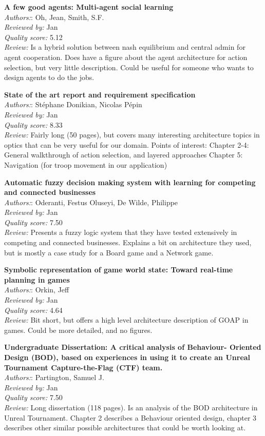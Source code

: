 \textbf{A few good agents: Multi-agent social learning}\\
\textit{Authors:}: Oh, Jean, Smith, S.F.\\
\textit{Reviewed by:} Jan\\
\textit{Quality score:} 5.12\\
\textit{Review:} Is a hybrid solution between nash equilibrium and central admin for agent cooperation. Does have a figure about the agent architecture for action selection, but very little description. Could be useful for someone who wants to design agents to do the jobs.

\textbf{State of the art report and requirement specification}\\
\textit{Authors:}: St\'{e}phane Donikian, Nicolas P\'{e}pin\\
\textit{Reviewed by:} Jan\\
\textit{Quality score:} 8.33\\
\textit{Review:} Fairly long (50 pages), but covers many interesting architecture topics in optics that can be very useful for our domain. Points of interest:
Chapter 2-4: General walkthrough of action selection, and layered approaches
Chapter 5: Navigation (for troop movement in our application)

\textbf{Automatic fuzzy decision making system with learning for competing and connected businesses}\\
\textit{Authors:}: Oderanti, Festus Oluseyi, De Wilde, Philippe\\
\textit{Reviewed by:} Jan\\
\textit{Quality score:} 7.50\\
\textit{Review:} Presents a fuzzy logic system that they have tested extensively in competing and connected businesses. Explains a bit on architecture they used, but is mostly a case study for a Board game and a Network game.

\textbf{Symbolic representation of game world state: Toward real-time planning in games}\\
\textit{Authors:}: Orkin, Jeff\\
\textit{Reviewed by:} Jan\\
\textit{Quality score:} 4.64\\
\textit{Review:} Bit short, but offers a high level architecture description of GOAP in games. Could be more detailed, and no figures. 

\textbf{Undergraduate Dissertation: A critical analysis of Behaviour- Oriented Design (BOD), based on experiences in using it to create an Unreal Tournament Capture-the-Flag (CTF) team.}\\
\textit{Authors:}: Partington, Samuel J.\\
\textit{Reviewed by:} Jan\\
\textit{Quality score:} 7.50\\
\textit{Review:} Long dissertation (118 pages). Is an analysis of the BOD architecture in Unreal Tournament. Chapter 2 describes a Behaviour oriented design, chapter 3 describes other similar possible architectures that could be worth looking at.

